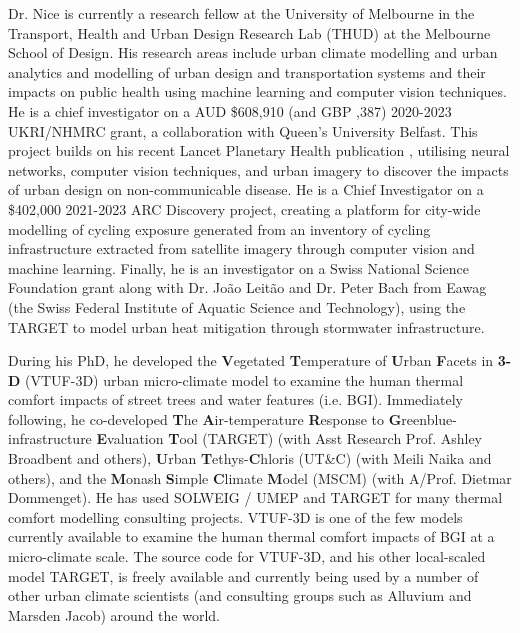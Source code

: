 Dr. Nice is currently a research fellow at the University of Melbourne in the Transport, Health and Urban Design Research Lab (THUD) at the Melbourne School of Design. His research areas include urban climate modelling and urban analytics and modelling of urban design and transportation systems and their impacts on public health using machine learning and computer vision techniques. He is a chief investigator on a AUD \$608,910 (and GBP ,387) 2020-2023 UKRI/NHMRC grant, a collaboration with Queen's University Belfast. This project builds on his recent Lancet Planetary Health publication \cite{Thompson2020}, utilising neural networks, computer vision techniques, and urban imagery to discover the impacts of urban design on non-communicable disease. He is a Chief Investigator on a \$402,000 2021-2023 ARC Discovery project, creating a platform for city-wide modelling of cycling exposure generated from an inventory of cycling infrastructure extracted from satellite imagery through computer vision and machine learning. Finally, he is an investigator on a Swiss National Science Foundation grant along with Dr. Jo\~{a}o Leit\~{a}o and Dr. Peter Bach from Eawag (the Swiss Federal Institute of Aquatic Science and Technology), using the TARGET to model urban heat mitigation through stormwater infrastructure.

During his PhD, he developed the \textbf{V}egetated \textbf{T}emperature of \textbf{U}rban \textbf{F}acets in \textbf{3-D} (VTUF-3D)\cite{Nice2018a} urban micro-climate model to examine the human thermal comfort impacts of street trees and water features (i.e. BGI). Immediately following, he co-developed \textbf{T}he \textbf{A}ir-temperature \textbf{R}esponse to \textbf{G}reenblue-infrastructure \textbf{E}valuation \textbf{T}ool (TARGET)\cite{Broadbent2019c} (with Asst Research Prof. Ashley Broadbent and others), \textbf{U}rban \textbf{T}ethys-\textbf{C}hloris (UT\&C)\cite{Meili2020} (with Meili Naika and others), and the \textbf{M}onash \textbf{S}imple \textbf{C}limate \textbf{M}odel\cite{Dommenget2019} (MSCM) (with A/Prof. Dietmar Dommenget). He has used SOLWEIG / UMEP\cite{Lindberg2018} and TARGET for many thermal comfort modelling consulting projects. VTUF-3D is one of the few models currently available to examine the human thermal comfort impacts of BGI at a micro-climate scale. The source code for VTUF-3D, and his other local-scaled model TARGET, is freely available and currently being used by a number of other urban climate scientists (and consulting groups such as Alluvium\cite{MosiacInsights2020} and Marsden Jacob) around the world. 

